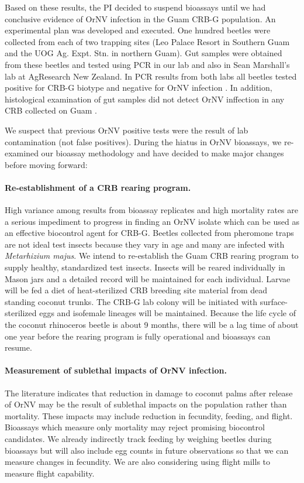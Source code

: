 \documentclass[12pt,letterpaper,english,bibliography=totocnumbered,abstract=on]{scrartcl}
\begin{document}
Based on these results, the PI decided to suspend bioassays until we had conclusive evidence of OrNV infection in the Guam CRB-G population. An experimental plan \cite{mooreExperimentalPlanDetermining2020} was
developed and executed. One hundred beetles were collected from each of two trapping sites
(Leo Palace Resort in Southern Guam and the UOG Ag. Expt. Stn. in northern Guam).
Gut samples were obtained from these beetles and tested using PCR in our lab and also in
Sean Marshall's lab at AgResearch New Zealand. In PCR results from both labs all beetles tested positive for CRB-G biotype and negative for OrNV infection \cite{graselaInvestigationDeterminePresence2020}. In addition, histological examination of gut samples did not detect OrNV inffection in any CRB collected on Guam \cite{marshallCRBHaplotypePCR2021}.

We suspect that
previous OrNV positive tests were the result of lab contamination (not false positives).
During the hiatus in OrNV bioassays, we re-examined our bioassay methodology and have
decided to make major changes before moving forward:

\paragraph{Re-establishment of a CRB rearing program.} High variance among results from bioassay
replicates and high mortality rates are a serious impediment to progress in finding an
OrNV isolate which can be used as an effective biocontrol agent for CRB-G. Beetles
collected from pheromone traps are not ideal test insects because they vary in age and
many are infected with \textit{Metarhizium majus}.
We intend to re-establish the Guam CRB rearing program to supply healthy, standardized test insects. Insects will be reared individually in Mason jars and a detailed record
will be maintained for each individual. Larvae will be fed a diet of heat-sterilized CRB
breeding site material from dead standing coconut trunks. The CRB-G lab colony will
be initiated with surface-sterilized eggs and isofemale lineages will be maintained.
Because the life cycle of the coconut rhinoceros beetle is about 9 months, there will
be a lag time of about one year before the rearing program is fully operational and bioassays can resume.

\paragraph{Measurement of sublethal impacts of OrNV infection.} The literature indicates
that reduction in damage to coconut palms after release of OrNV may be the result of
sublethal impacts on the population rather than mortality. These impacts may include
reduction in fecundity, feeding, and flight. Bioassays which measure only mortality may
reject promising biocontrol candidates.
We already indirectly track feeding by weighing beetles during bioassays but will also
include egg counts in future observations so that we can measure changes in fecundity. We are also considering using flight mills to measure flight capability.
\end{document}
